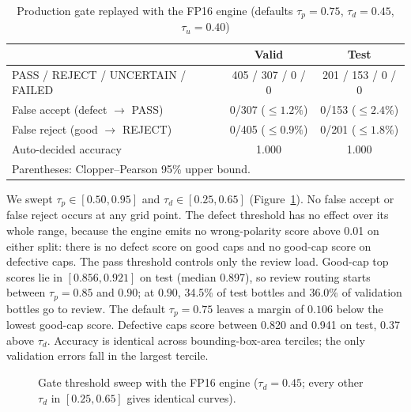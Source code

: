 \begin{table}[htbp]
\centering
\caption{Production gate replayed with the FP16 engine (defaults $\tau_p=0.75$, $\tau_d=0.45$, $\tau_u=0.40$)}
\label{tab:gate}
\begin{tabular}{|l|c|c|}
\hline
 & \textbf{Valid} & \textbf{Test} \\ \hline
PASS / REJECT / UNCERTAIN / FAILED & 405 / 307 / 0 / 0 & 201 / 153 / 0 / 0 \\ \hline
False accept (defect $\rightarrow$ PASS) & 0/307 ($\leq1.2\%$) & 0/153 ($\leq2.4\%$) \\ \hline
False reject (good $\rightarrow$ REJECT) & 0/405 ($\leq0.9\%$) & 0/201 ($\leq1.8\%$) \\ \hline
Auto-decided accuracy & 1.000 & 1.000 \\ \hline
\multicolumn{3}{l}{\small Parentheses: Clopper--Pearson 95\% upper bound.}
\end{tabular}
\end{table}

We swept $\tau_p\in[0.50,0.95]$ and $\tau_d\in[0.25,0.65]$ (Figure~\ref{fig:sweep}). No false accept or false reject occurs at any grid point. The defect threshold has no effect over its whole range, because the engine emits no wrong-polarity score above 0.01 on either split: there is no defect score on good caps and no good-cap score on defective caps. The pass threshold controls only the review load. Good-cap top scores lie in $[0.856, 0.921]$ on test (median 0.897), so review routing starts between $\tau_p=0.85$ and $0.90$; at $0.90$, 34.5\% of test bottles and 36.0\% of validation bottles go to review. The default $\tau_p=0.75$ leaves a margin of $0.106$ below the lowest good-cap score. Defective caps score between 0.820 and 0.941 on test, 0.37 above $\tau_d$. Accuracy is identical across bounding-box-area terciles; the only validation errors fall in the largest tercile.

\begin{figure}[htbp]
\centering
{}
\caption[Gate threshold sweep]{Gate threshold sweep with the FP16 engine ($\tau_d=0.45$; every other $\tau_d$ in $[0.25,0.65]$ gives identical curves).}
\label{fig:sweep}
\end{figure}

